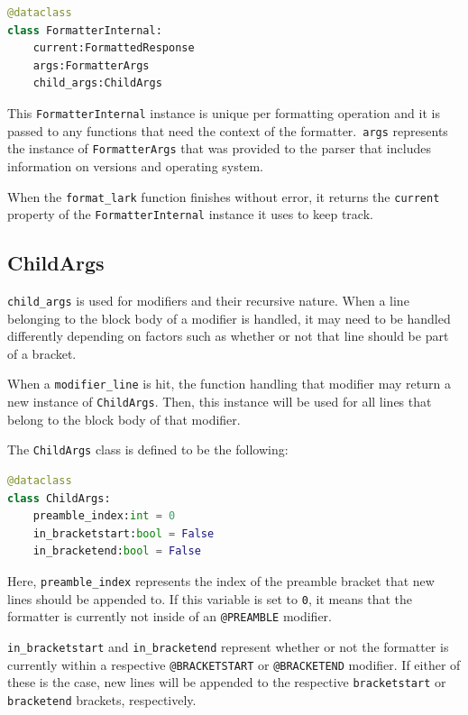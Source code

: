 \begin{lstlisting}[language=Python, caption={Class definition of \texttt{FormatterInternal}.}, label={lst:class_definition_parser_formatter_internal}]
@dataclass
class FormatterInternal:
    current:FormattedResponse
    args:FormatterArgs
    child_args:ChildArgs
\end{lstlisting}

This \verb|FormatterInternal| instance is unique per formatting operation and it is passed to any functions that need the context of the formatter.\ \verb|args| represents the instance of \verb|FormatterArgs| that was provided to the parser that includes information on versions and operating system. 

When the \verb|format_lark| function finishes without error, it returns the \verb|current| property of the \verb|FormatterInternal| instance it uses to keep track. 

\subsection{ChildArgs}

\verb|child_args| is used for modifiers and their recursive nature. When a line belonging to the block body of a modifier is handled, it may need to be handled differently depending on factors such as whether or not that line should be part of a bracket. 

When a \verb|modifier_line| is hit, the function handling that modifier may return a new instance of \verb|ChildArgs|. Then, this instance will be used for all lines that belong to the block body of that modifier. 

The \verb|ChildArgs| class is defined to be the following:

\begin{lstlisting}[language=Python, caption={Class definition of \texttt{ChildArgs}.}, label={lst:class_definition_parser_child_args}]
@dataclass
class ChildArgs:
    preamble_index:int = 0
    in_bracketstart:bool = False
    in_bracketend:bool = False
\end{lstlisting}

Here, \verb|preamble_index| represents the index of the preamble bracket that new lines should be appended to. If this variable is set to \verb|0|, it means that the formatter is currently not inside of an \verb|@PREAMBLE| modifier. 

\verb|in_bracketstart| and \verb|in_bracketend| represent whether or not the formatter is currently within a respective \verb|@BRACKETSTART| or \verb|@BRACKETEND| modifier. If either of these is the case, new lines will be appended to the respective \verb|bracketstart| or \verb|bracketend| brackets, respectively.

